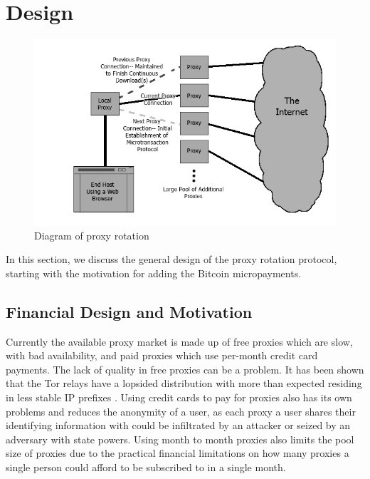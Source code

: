 \section{Design}
\label{sec:design}


\begin{figure}
  \centering
  \includegraphics[width=1.05\textwidth]{proxydiagram.png}
  \caption{Diagram of proxy rotation}
  \label{fig:proxy-diagram}
\end{figure}

In this section, we discuss the general design of the proxy rotation protocol, starting with the motivation for adding the Bitcoin micropayments.

\subsection{Financial Design and Motivation}

Currently the available proxy market is made up of free proxies which are slow, with bad availability, and paid proxies which use per-month credit card payments. The lack of quality in free proxies can be a problem. It has been shown that the Tor relays have a lopsided distribution with more than expected residing in less stable IP prefixes \cite{vanbever2014anonymity}. Using credit cards to pay for proxies also has its own problems and reduces the anonymity of a user, as each proxy a user shares their identifying information with could be infiltrated by an attacker or seized by an adversary with state powers. Using month to month proxies also limits the pool size of proxies due to the practical financial limitations on how many proxies a single person could afford to be subscribed to in a single month. 


